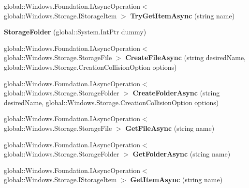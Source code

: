 \begin{DoxyCompactItemize}
global\+::\+Windows.\+Foundation.\+I\+Async\+Operation$<$ global\+::\+Windows.\+Storage.\+I\+Storage\+Item $>$ {\bfseries Try\+Get\+Item\+Async} (string name)
\item 
\mbox{\label{class_windows_1_1_storage_1_1_storage_folder_a3088d0d3f00525cc36b786ec7b321398}} 
{\bfseries Storage\+Folder} (global\+::\+System.\+Int\+Ptr dummy)
\item 
\mbox{\label{class_windows_1_1_storage_1_1_storage_folder_a1148f0c45b571856ab96a2bf97e2dd87}} 
global\+::\+Windows.\+Foundation.\+I\+Async\+Operation$<$ global\+::\+Windows.\+Storage.\+Storage\+File $>$ {\bfseries Create\+File\+Async} (string desired\+Name, global\+::\+Windows.\+Storage.\+Creation\+Collision\+Option options)
\item 
\mbox{\label{class_windows_1_1_storage_1_1_storage_folder_ad7abc9e33097dc2a8e60d66d76e5558c}} 
global\+::\+Windows.\+Foundation.\+I\+Async\+Operation$<$ global\+::\+Windows.\+Storage.\+Storage\+Folder $>$ {\bfseries Create\+Folder\+Async} (string desired\+Name, global\+::\+Windows.\+Storage.\+Creation\+Collision\+Option options)
\item 
\mbox{\label{class_windows_1_1_storage_1_1_storage_folder_a3766a445bb3e86f2bf570d83084bb729}} 
global\+::\+Windows.\+Foundation.\+I\+Async\+Operation$<$ global\+::\+Windows.\+Storage.\+Storage\+File $>$ {\bfseries Get\+File\+Async} (string name)
\item 
\mbox{\label{class_windows_1_1_storage_1_1_storage_folder_abb723045c2ef18ea0a93b5788948994c}} 
global\+::\+Windows.\+Foundation.\+I\+Async\+Operation$<$ global\+::\+Windows.\+Storage.\+Storage\+Folder $>$ {\bfseries Get\+Folder\+Async} (string name)
\item 
\mbox{\label{class_windows_1_1_storage_1_1_storage_folder_ac931af40aac04b2aff19610399dbae2e}} 
global\+::\+Windows.\+Foundation.\+I\+Async\+Operation$<$ global\+::\+Windows.\+Storage.\+I\+Storage\+Item $>$ {\bfseries Get\+Item\+Async} (string name)
\item 

\end{DoxyCompactItemize}
